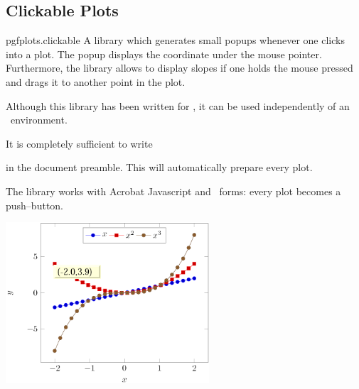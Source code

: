 \subsection{Clickable Plots}
\begin{tikzlibrary}{pgfplots.clickable}
	A library which generates small popups whenever one clicks into a plot. The popup displays the coordinate under the mouse pointer. Furthermore, the library allows to display slopes if one holds the mouse pressed and drags it to another point in the plot.

	Although this library has been written for \PGFPlots, it can be used independently of an \PGFPlots\ environment.

	It is completely sufficient to write
\begin{codeexample}
\usetikzlibrary{pgfplots.clickable}
\end{codeexample}
	\noindent in the document preamble. This will automatically prepare every plot.

	The library works with Acrobat Javascript and \pdf\ forms: every plot becomes a push--button. 

	\includegraphics[height=6cm]{figures/pgfplotsclickable-fig1.png}
	\hfill


\end{tikzlibrary}
